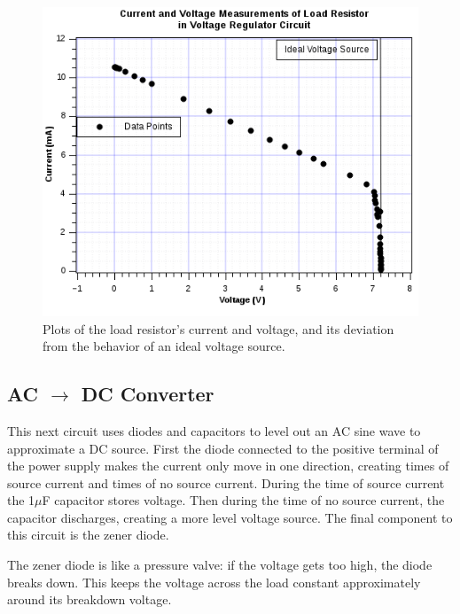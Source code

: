 \documentclass[twocolumn,english]{IEEEtran}
\begin{document}
\begin{figure}[h]
  \begin{centering}
  \begin{center}
  \includegraphics[width=\linewidth]{./voltage_reg.png}
  \caption{Plots of the load resistor's current and voltage, and its deviation from the behavior of an ideal voltage source.}
  \label{fig:voltage_reg}
  \end{center}
  \par\end{centering}
  \end{figure}






\subsection{\textbf{AC $\rightarrow$ DC Converter}}
This next circuit uses diodes and capacitors to level out an AC sine wave to approximate a DC source. First the diode connected to the positive terminal of the power supply makes the current only move in one direction, creating times of source current and times of no source current. During the time of source current the 1$\mu$F capacitor stores voltage. Then during the time of no source current, the capacitor discharges, creating a more level voltage source. The final component to this circuit is the zener diode.

The zener diode is like a pressure valve: if the voltage gets too high, the diode breaks down. This keeps the voltage across the load constant approximately around its breakdown voltage.
\end{document}
